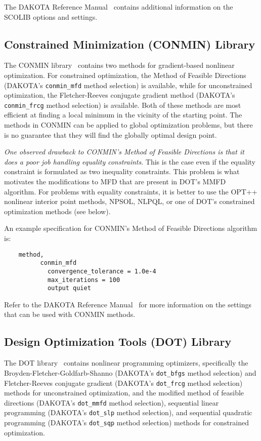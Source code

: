 The DAKOTA Reference Manual~\cite{RefMan} contains additional information
on the SCOLIB options and settings.

\subsection{Constrained Minimization (CONMIN) Library}\label{opt:software:conmin}

The CONMIN library~\cite{Van78} contains two methods for gradient-based
nonlinear optimization. For constrained optimization, the Method of
Feasible Directions (DAKOTA's \texttt{conmin\_mfd} method selection)
is available, while for unconstrained optimization, the
Fletcher-Reeves conjugate gradient method (DAKOTA's
\texttt{conmin\_frcg} method selection) is available. Both of these
methods are most efficient at finding a local minimum in the vicinity
of the starting point. The methods in CONMIN can be applied to global
optimization problems, but there is no guarantee that they will find
the globally optimal design point.

\emph{One observed drawback to CONMIN's Method of Feasible Directions
is that it does a poor job handling equality constraints}. This is the
case even if the equality constraint is formulated as two inequality
constraints. This problem is what motivates the modifications to MFD
that are present in DOT's MMFD algorithm. For problems with equality
constraints, it is better to use the OPT++ nonlinear interior point
methods, NPSOL, NLPQL, or one of DOT's constrained optimization
methods (see below).

An example specification for CONMIN's Method of Feasible Directions
algorithm is:
\begin{small}
\begin{verbatim}
    method,
          conmin_mfd
            convergence_tolerance = 1.0e-4
            max_iterations = 100
            output quiet
\end{verbatim}
\end{small}

Refer to the DAKOTA Reference Manual~\cite{RefMan} for more information on
the settings that can be used with CONMIN methods.

\subsection{Design Optimization Tools (DOT) Library}\label{opt:software:dot}

The DOT library~\cite{Van95} contains nonlinear programming optimizers,
specifically the Broyden-Fletcher-Goldfarb-Shanno (DAKOTA's
\texttt{dot\_bfgs} method selection) and Fletcher-Reeves conjugate
gradient (DAKOTA's \texttt{dot\_frcg} method selection) methods for
unconstrained optimization, and the modified method of feasible
directions (DAKOTA's \texttt{dot\_mmfd} method selection), sequential
linear programming (DAKOTA's \texttt{dot\_slp} method selection), and
sequential quadratic programming (DAKOTA's \texttt{dot\_sqp} method
selection) methods for constrained optimization.

